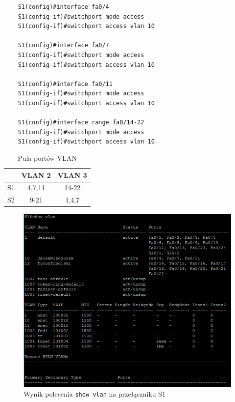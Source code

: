 \documentclass[wide,a4paper,titlepage,12pt] {article}
\begin{document}
  \begin{verbatim}
    S1(config)#interface fa0/4
    S1(config-if)#switchport mode access
    S1(config-if)#switchport access vlan 10

    S1(config)#interface fa0/7
    S1(config-if)#switchport mode access
    S1(config-if)#switchport access vlan 10

    S1(config)#interface fa0/11
    S1(config-if)#switchport mode access
    S1(config-if)#switchport access vlan 10

    S1(config)#interface range fa0/14-22
    S1(config-if)#switchport mode access
    S1(config-if)#switchport access vlan 10
  \end{verbatim}


  \begin{table}[H]
    \begin{center}
      \begin{tabular}{|c|c|c|}
      \hline
      & VLAN 2 & VLAN 3 \\
      \hline
      S1 & 4,7,11 & 14-22 \\
      \hline
      S2 & 9-21 & 1,4,7 \\
      \hline
      \end{tabular}
    \end{center}
    \caption{Pula portów VLAN}
    \label{tab:t1}
  \end{table}

  \begin{figure}[H]
    \begin{center}
      \includegraphics[width=\textwidth]{img/t6.PNG}
      \caption{Wynik polecenia \texttt{show vlan} na przełączniku S1}
      \label{fig:t6}
    \end{center}
  \end{figure}
\end{document}
